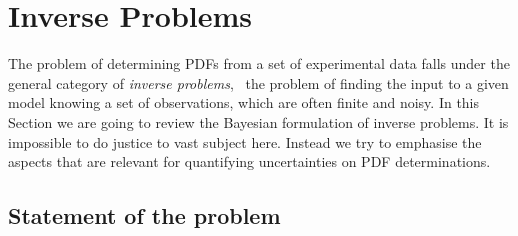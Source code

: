 
\section{Inverse Problems}
\label{sec:inverse-problems}

The problem of determining PDFs from a set of experimental data falls under the
general category of {\em inverse problems}, \ie\ the problem of finding the
input to a given model knowing a set of observations, which are often finite and
noisy. In this Section we are going to review the Bayesian formulation of
inverse problems. It is impossible to do justice to vast subject here. Instead
we try to emphasise the aspects that are relevant for quantifying uncertainties
on PDF determinations. 

\subsection{Statement of the problem}
\label{sec:BayesianInverse}

